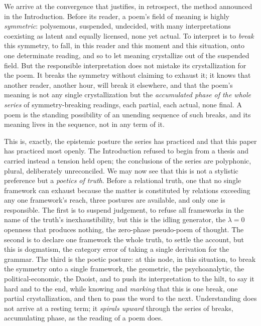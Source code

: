We arrive at the convergence that justifies, in retrospect, the method announced in the Introduction. Before its reader, a poem's field of meaning is highly \emph{symmetric}: polysemous, suspended, undecided, with many interpretations coexisting as latent and equally licensed, none yet actual. To interpret is to \emph{break} this symmetry, to fall, in this reader and this moment and this situation, onto one determinate reading, and so to let meaning crystallize out of the suspended field. But the responsible interpretation does not mistake its crystallization for the poem. It breaks the symmetry without claiming to exhaust it; it knows that another reader, another hour, will break it elsewhere, and that the poem's meaning is not any single crystallization but the \emph{accumulated phase of the whole series} of symmetry-breaking readings, each partial, each actual, none final. A poem is the standing possibility of an unending sequence of such breaks, and its meaning lives in the sequence, not in any term of it.

This is, exactly, the epistemic posture the series has practiced and that this paper has practiced most openly. The Introduction refused to begin from a thesis and carried instead a tension held open; the conclusions of the series are polyphonic, plural, deliberately unreconciled. We may now see that this is not a stylistic preference but a \emph{poetics of truth}. Before a relational truth, one that no single framework can exhaust because the matter is constituted by relations exceeding any one framework's reach, three postures are available, and only one is responsible. The first is to suspend judgement, to refuse all frameworks in the name of the truth's inexhaustibility, but this is the idling generator, the $\lambda = 0$ openness that produces nothing, the zero-phase pseudo-poem of thought. The second is to declare one framework the whole truth, to settle the account, but this is dogmatism, the category error of taking a single derivation for the grammar. The third is the poetic posture: at this node, in this situation, to break the symmetry onto a single framework, the geometric, the psychoanalytic, the political-economic, the Daoist, and to push its interpretation to the hilt, to say it hard and to the end, while knowing and \emph{marking} that this is one break, one partial crystallization, and then to pass the word to the next. Understanding does not arrive at a resting term; it \emph{spirals upward} through the series of breaks, accumulating phase, as the reading of a poem does.

